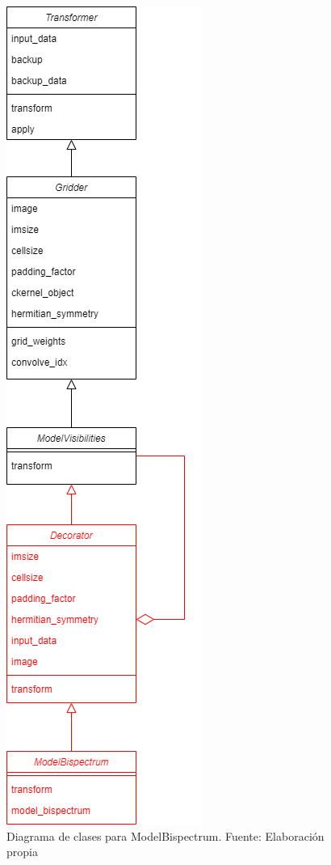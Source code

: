 \begin{figure}[!ht]
	\centering
	\captionsetup{justification=centering}
	\includegraphics[scale=0.4]{images/Pyralysis-ModelBispectrum.png}
	\caption[Diagrama de clases para ModelBispectrum]{Diagrama de clases para ModelBispectrum. Fuente: Elaboración propia}
	\label{fig:modelBispectrum_diagram}
\end{figure}

